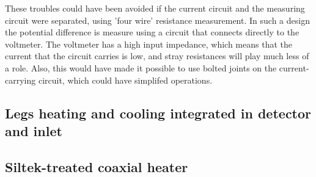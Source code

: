 These troubles could have been avoided if the current circuit and the measuring
circuit were separated, using 'four wire' resistance measurement. In such a
design the potential difference is measure using a circuit that connects
directly to the voltmeter. The voltmeter has a high input impedance, which means
that the current that the circuit carries is low, and stray resistances will
play much less of a role. Also, this would have made it possible to use bolted
joints on the current-carrying circuit, which could have simplifed operations.

\subsection{Legs heating and cooling integrated in detector and inlet}


\subsection{Siltek-treated coaxial heater}



\todos
